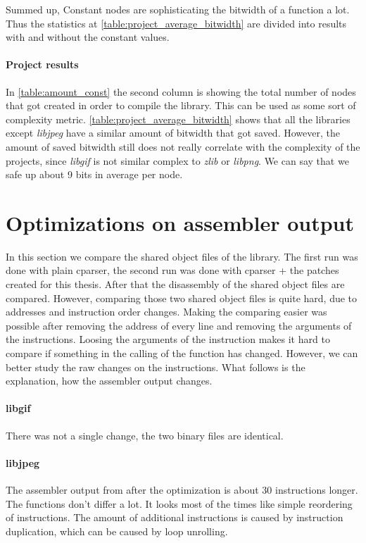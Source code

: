 Summed up, Constant nodes are sophisticating the bitwidth of a function a lot. Thus the statistics at \ref{table:project_average_bitwidth} are divided into results with and without the constant values.

\paragraph{Project results}

In \autoref{table:amount_const} the second column is showing the total number of nodes that got created in order to compile the library. This can be used as some sort of complexity metric. 
\autoref{table:project_average_bitwidth} shows that all the libraries except \textit{libjpeg} have a similar amount of bitwidth that got saved. However, the amount of saved bitwidth still does not really correlate with the complexity of the projects, since \textit{libgif} is not similar complex to \textit{zlib} or \textit{libpng}.\newline
We can say that we safe up about 9 bits in average per node.

\section{Optimizations on assembler output}

In this section we compare the shared object files of the library. The first run was done with plain cparser, the second run was done with cparser + the patches created for this thesis.\newline
After that the disassembly of the shared object files are compared. However, comparing those two shared object files is quite hard, due to addresses and instruction order changes. Making the comparing easier was possible after removing the address of every line and removing the arguments of the instructions. Loosing the arguments of the instruction makes it hard to compare if something in the calling of the function has changed. However, we can better study the raw changes on the instructions. What follows is the explanation, how the assembler output changes.

\paragraph{libgif} There was not a single change, the two binary files are identical.
\paragraph{libjpeg} The assembler output from after the optimization is about 30 instructions longer. The functions don't differ a lot. It looks most of the times like simple reordering of instructions. The amount of additional instructions is caused by instruction duplication, which can be caused by loop unrolling.


